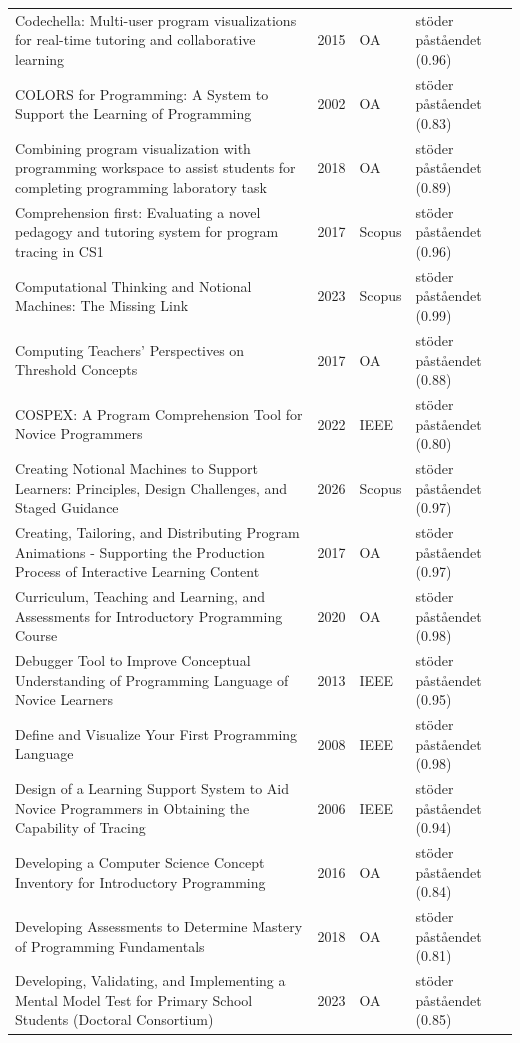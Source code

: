 \begin{longtable}{@{}%
  >{\raggedright\arraybackslash}p{}c%
  >{\raggedright\arraybackslash}p{}%
  >{\raggedright\arraybackslash}p{}@{}}
Codechella: Multi-user program visualizations for real-time tutoring and collaborative learning & 2015 & OA & stöder påståendet (0.96) \\
COLORS for Programming: A System to Support the Learning of Programming & 2002 & OA & stöder påståendet (0.83) \\
Combining program visualization with programming workspace to assist students for completing programming laboratory task & 2018 & OA & stöder påståendet (0.89) \\
Comprehension first: Evaluating a novel pedagogy and tutoring system for program tracing in CS1 & 2017 & Scopus & stöder påståendet (0.96) \\
Computational Thinking and Notional Machines: The Missing Link & 2023 & Scopus & stöder påståendet (0.99) \\
Computing Teachers' Perspectives on Threshold Concepts & 2017 & OA & stöder påståendet (0.88) \\
COSPEX: A Program Comprehension Tool for Novice Programmers & 2022 & IEEE & stöder påståendet (0.80) \\
Creating Notional Machines to Support Learners: Principles, Design Challenges, and Staged Guidance & 2026 & Scopus & stöder påståendet (0.97) \\
Creating, Tailoring, and Distributing Program Animations - Supporting the Production Process of Interactive Learning Content & 2017 & OA & stöder påståendet (0.97) \\
Curriculum, Teaching and Learning, and Assessments for Introductory Programming Course & 2020 & OA & stöder påståendet (0.98) \\
Debugger Tool to Improve Conceptual Understanding of Programming Language of Novice Learners & 2013 & IEEE & stöder påståendet (0.95) \\
Define and Visualize Your First Programming Language & 2008 & IEEE & stöder påståendet (0.98) \\
Design of a Learning Support System to Aid Novice Programmers in Obtaining the Capability of Tracing & 2006 & IEEE & stöder påståendet (0.94) \\
Developing a Computer Science Concept Inventory for Introductory Programming & 2016 & OA & stöder påståendet (0.84) \\
Developing Assessments to Determine Mastery of Programming Fundamentals & 2018 & OA & stöder påståendet (0.81) \\
Developing, Validating, and Implementing a Mental Model Test for Primary School Students (Doctoral Consortium) & 2023 & OA & stöder påståendet (0.85) \\

\end{longtable}
